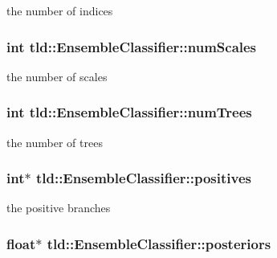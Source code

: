 the number of indices 

\hypertarget{classtld_1_1EnsembleClassifier_ae10dcd7614a39f9b29b3fbe957889fb9}{
\subsubsection[{num\-Scales}]{\setlength{\rightskip}{0pt plus 5cm}int tld\-::\-Ensemble\-Classifier\-::num\-Scales}}\label{classtld_1_1EnsembleClassifier_ae10dcd7614a39f9b29b3fbe957889fb9}


the number of scales 

\hypertarget{classtld_1_1EnsembleClassifier_a60e802769e79c833d1484d96bb345b7c}{
\subsubsection[{num\-Trees}]{\setlength{\rightskip}{0pt plus 5cm}int tld\-::\-Ensemble\-Classifier\-::num\-Trees}}\label{classtld_1_1EnsembleClassifier_a60e802769e79c833d1484d96bb345b7c}


the number of trees 

\hypertarget{classtld_1_1EnsembleClassifier_a572549e31f9bfc34c7b464e02aa41397}{
\subsubsection[{positives}]{\setlength{\rightskip}{0pt plus 5cm}int$\ast$ tld\-::\-Ensemble\-Classifier\-::positives}}\label{classtld_1_1EnsembleClassifier_a572549e31f9bfc34c7b464e02aa41397}


the positive branches 

\hypertarget{classtld_1_1EnsembleClassifier_a34092918268be97eb1e1f2f0fc7d4254}{
\subsubsection[{posteriors}]{\setlength{\rightskip}{0pt plus 5cm}float$\ast$ tld\-::\-Ensemble\-Classifier\-::posteriors}}\label{classtld_1_1EnsembleClassifier_a34092918268be97eb1e1f2f0fc7d4254}


